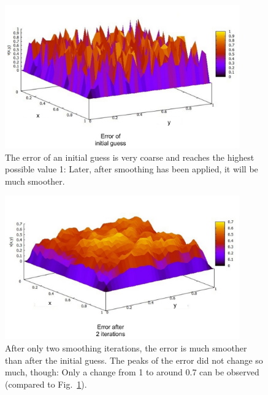 \begin{figure}[tbp]
	\centering
	\includegraphics[width=0.9\textwidth]{chapters/chapter02/mg_error_smoothing_initial}
	\caption{The error of an initial guess is very coarse and reaches the highest possible value 1: Later, after smoothing has been applied, it will be much smoother.}
	\label{fig:mg_error_smoothing_initial}
\end{figure}

\begin{figure}[tbp]
	\centering
	\includegraphics[width=0.9\textwidth]{chapters/chapter02/mg_error_smoothing_2}
	\caption{After only two smoothing iterations, the error is much smoother than after the initial guess. The peaks of the error did not change so much, though: Only a change from 1 to around 0.7 can be observed (compared to Fig.~\ref{fig:mg_error_smoothing_initial}).}
	\label{fig:mg_error_smoothing_2}
\end{figure}


